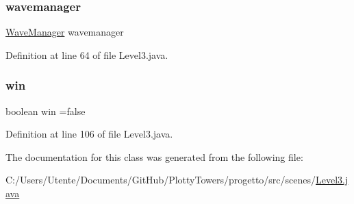 \subsubsection{\texorpdfstring{wavemanager}{wavemanager}}
{\footnotesize\ttfamily \hyperlink{classmanagers_1_1_wave_manager}{Wave\+Manager} wavemanager\hspace{0.3cm}{\ttfamily [private]}}



Definition at line 64 of file Level3.\+java.

\mbox{\label{classscenes_1_1_level3_a1cc7b399bb950a160021766cd9a126f8}} 
\subsubsection{\texorpdfstring{win}{win}}
{\footnotesize\ttfamily boolean win =false\hspace{0.3cm}{\ttfamily [private]}}



Definition at line 106 of file Level3.\+java.



The documentation for this class was generated from the following file\+:\begin{DoxyCompactItemize}
\item 
C\+:/\+Users/\+Utente/\+Documents/\+Git\+Hub/\+Plotty\+Towers/progetto/src/scenes/\hyperlink{_level3_8java}{Level3.\+java}\end{DoxyCompactItemize}
